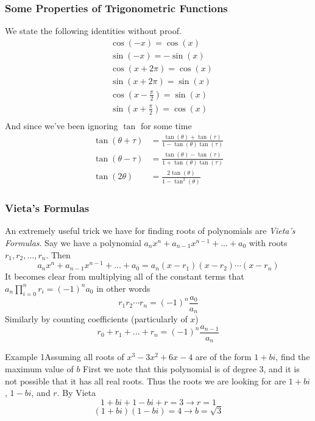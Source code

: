 \subsubsection{Some Properties of Trigonometric Functions}
We state the following identities without proof.
\begin{align*}
	&\cos(-x) = \cos(x)\\
	&\sin(-x) = -\sin(x)\\
	&\cos(x + 2\pi) = \cos(x)\\
	&\sin(x + 2\pi) = \sin(x)\\
	&\cos\left(x - \frac{\pi}{2}\right) = \sin(x)\\
	&\sin\left( x + \frac{\pi}{2}\right) = \cos(x)\\
\end{align*}
And since we've been ignoring $\tan$ for some time
\begin{align*}
	\tan(\theta + \tau) & = \frac{\tan(\theta)+\tan(\tau)}{1-\tan(\theta)\tan(\tau)} \\
	\tan(\theta - \tau) & = \frac{\tan(\theta) - \tan(\tau)}{1 + \tan(\theta)\tan(\tau)}\\
	\tan(2\theta) &= \frac{2\tan(\theta)}{1-\tan^{2}(\theta)}
\end{align*}

\subsubsection{Vieta's Formulas}
An extremely useful trick we have for finding roots of polynomials are \textit{Vieta's Formulas}.
Say we have a polynomial $a_n x^n + a_{n-1}x^{n-1} + ... + a_{0}$ with roots $r_{1}, r_2, ..., r_n$.
Then $$a_{n}x^n + a_{n-1}x^{n-1} + ... + a_0 = a_{n}(x-r_1)(x-r_2)\cdots(x-r_n)$$
It becomes clear from multiplying all of the constant terms that $a_{n}\prod_{i=0}^{n}r_i = (-1)^{n}a_0$ in other words $$r_1 r_2 \cdots r_n = (-1)^{n}\frac{a_0}{a_n}$$
Similarly by counting coefficients (particularly of $x$)$$r_0 + r_1 + ... + r_n = (-1)^{n} \frac{a_{n-1}}{a_n}$$

\begin{problem}{Example 1}{Assuming all roots of $x^3 - 3x^2 + 6x - 4$ are of the form $1+bi$, find the maximum value of $b$}
	First we note that this polynomial is of degree 3, and it is not possible that it has all real roots.
	Thus the roots we are looking for are $1+bi$, $1-bi$, and $r$. By Vieta $$1+bi + 1 -bi + r = 3 \rightarrow r = 1$$
	$$(1+bi)(1-bi) = 4 \rightarrow b = \sqrt{3}$$
\end{problem}



